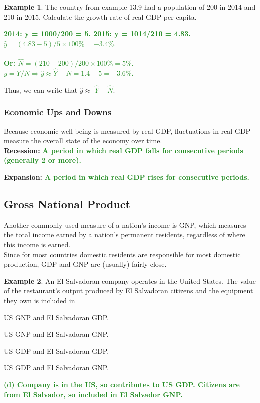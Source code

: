 \documentclass[11pt]{article}\usepackage[]{graphicx}\usepackage[]{color}
\theoremstyle{definition}
\newtheorem{exmp}{Example}[section]
\newcommand{\blank}[1]{}
\newcommand{\ddp}[1]{{\textbf{\textcolor{ForestGreen}{#1}}}}
\newcommand{\dd}[1]{{\underline{\textbf{\textcolor{ForestGreen}{#1}}}}}
\newcommand{\defn}[1]{\textbf{#1}}
\begin{document}
\begin{exmp} 
	The country from example 13.9 had a population of 200 in 2014 and 210 in 2015. Calculate the growth rate of real GDP per capita.
\end{exmp}
\blank{}
\blank{}
\ddp{2014: y = 1000/200 = 5. 2015: y = 1014/210 = 4.83. $\hat{y} = (4.83 - 5)/5 \times 100\% = -3.4\%.$ \\ \\
	Or: $\hat{N} = (210 - 200)/200 \times 100\% = 5\%.$ $y = Y/N \Rightarrow \hat{y}\approx \hat{Y} - \hat{N} = 1.4 - 5 = -3.6\%$. \\}

Thus, we can write that $\hat{y} \approx$ \dd{$\hat{Y} - \hat{N}$}.



\subsubsection*{Economic Ups and Downs}

Because economic well-being is measured by real GDP, fluctuations in real GDP measure the overall state of the economy over time.
\\

\defn{Recession:} \ddp{A period in which real GDP falls for consecutive periods (generally 2 or more).\\}

\defn{Expansion:} \ddp{A period in which real GDP rises for consecutive periods.}

\subsection{Gross National Product}

Another commonly used measure of a nation's income is GNP, which measures the total income earned by a nation's permanent residents, regardless of where this income is earned. 
\\

Since for most countries domestic residents are responsible for most domestic production, GDP and GNP are (usually) fairly close.
\\

\begin{exmp} An El Salvadoran company operates in the United States. The value of the restaurant's output produced by El Salvadoran citizens and the equipment they own is included in 

\begin{enumerate}[(a)]
	{\setlength\itemindent{25pt} \item US GNP and El Salvadoran GDP.}
	{\setlength\itemindent{25pt} \item US GNP and El Salvadoran GNP.}
	{\setlength\itemindent{25pt} \item US GDP and El Salvadoran GDP.}
	{\setlength\itemindent{25pt} \item US GDP and El Salvadoran GNP.}
\end{enumerate}
\end{exmp}
\ddp{(d) Company is in the US, so contributes to US GDP. Citizens are from El Salvador, so included in El Salvador GNP.}
\end{document}
